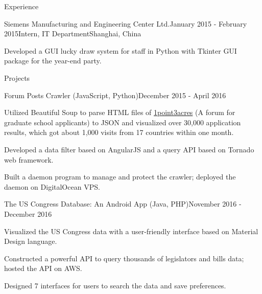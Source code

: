 \documentclass{resume} %
\begin{document}
\begin{rSection}{Experience}
\begin{rSubsection}{Siemens Manufacturing and Engineering Center Ltd.}{January 2015 - February 2015}{Intern, IT Department}{Shanghai, China}
\item Developed a GUI lucky draw system for staff in Python with Tkinter GUI package for the year-end party.
\end{rSubsection}


\end{rSection}


\begin{rSection}{Projects}

\begin{rSubsection}{Forum Posts Crawler (JavaScript, Python)}{December 2015 - April 2016}{}{}
\item Utilized Beautiful Soup to parse HTML files of \href{http://1point3acres.com/bbs/forum.php}{1point3acres} (A forum for graduate school applicants) to JSON and visualized over 30,000 application results, which got about 1,000 visits from 17 countries within one month.
\item Developed a data filter based on AngularJS and a query API based on Tornado web framework.
\item Built a daemon program to manage and protect the crawler; deployed the daemon on DigitalOcean VPS.
\end{rSubsection}

\begin{rSubsection}{The US Congress Database: An Android App (Java, PHP)}{November 2016 - December 2016}{}{}
\item Visualized the US Congress data with a user-friendly interface based on Material Design language.
\item Constructed a powerful API to query thousands of legislators and bills data; hosted the API on AWS.
\item Designed 7 interfaces for users to search the data and save preferences.
\end{rSubsection}


\end{rSection}
\end{document}

